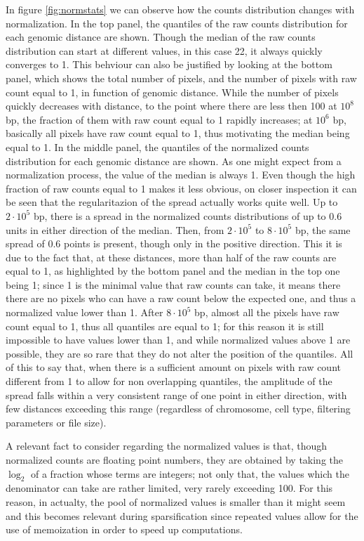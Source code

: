 In figure \ref{fig:normstats} we can observe how the counts distribution changes with normalization. In the top panel, the quantiles of the raw counts distribution for each genomic distance are shown. Though the median of the raw counts distribution can start at different values, in this case 22, it always quickly converges to 1. This behviour can also be justified by looking at the bottom panel, which shows the total number of pixels, and the number of pixels with raw count equal to 1, in function of genomic distance. While the number of pixels quickly decreases with distance, to the point where there are less then 100 at $10^8$ bp, the fraction of them with raw count equal to 1 rapidly increases; at $10^6$ bp, basically all pixels have raw count equal to 1, thus motivating the median being equal to 1. In the middle panel, the quantiles of the normalized counts distribution for each genomic distance are shown. As one might expect from a normalization process, the value of the median is always 1. Even though the high fraction of raw counts equal to 1 makes it less obvious, on closer inspection it can be seen that the regularitazion of the spread actually works quite well. Up to $2 \cdot 10^5$ bp, there is a spread in the normalized counts distributions of up to $0.6$ units in either direction of the median. Then, from $2 \cdot 10^5$ to $8 \cdot 10^5$ bp, the same spread of $0.6$ points is present, though only in the positive direction. This it is due to the fact that, at these distances, more than half of the raw counts are equal to 1, as highlighted by the bottom panel and the median in the top one being 1; since 1 is the minimal value that raw counts can take, it means there there are no pixels who can have a raw count below the expected one, and thus a normalized value lower than 1. After $8 \cdot 10^5$ bp, almost all the pixels have raw count equal to 1, thus all quantiles are equal to 1; for this reason it is still impossible to have values lower than 1, and while normalized values above 1 are possible, they are so rare that they do not alter the position of the quantiles. All of this to say that, when there is a sufficient amount on pixels with raw count different from 1 to allow for non overlapping quantiles, the amplitude of the spread falls within a very consistent range of one point in either direction, with few distances exceeding this range (regardless of chromosome, cell type, filtering parameters or file size). 


A relevant fact to consider regarding the normalized values is that, though normalized counts are floating point numbers, they are obtained by taking the $\log_2$ of a fraction whose terms are integers; not only that, the values which the denominator can take are rather limited, very rarely exceeding 100. For this reason, in actualty, the pool of normalized values is smaller than it might seem and this becomes relevant during sparsification since repeated values allow for the use of memoization in order to speed up computations.


